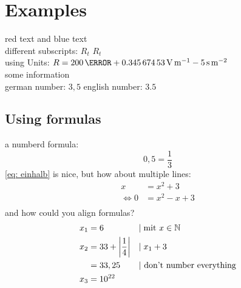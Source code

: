 \documentclass[	%
		fontsize=11pt,  %
		a4paper,	    %
		english,		%
		sans,			%
		f1,				%
	]{HsH-report}		%
\begin{document}
\chapter{Examples} \label{chap: one}
	{\color{red}red text} and {\color{blue}blue text} \\
	different subscripts: \normalsubscripts$R_t$ \upsubscripts$R_t$ \\
	using Units: $R=200\,\mohm + \SI{0.34567453}{\volt\per\metre} - 5\,\si{\second\per\metre\squared}$ \\
	some information\cite{laboranleitung:physik}\\
	german number: $3,5$ english number: $3.5$\\ %


	\section{Using formulas} \label{sec: formula}
		a numberd formula:
		\begin{equation}
			\label{eq: einhalb} %
			0,5=\frac{1}{3}
		\end{equation}
		\autoref{eq: einhalb} is nice, but how about multiple lines:
		\begin{equation}
		\begin{split} %
			x &= x^2+3 \\
			\Leftrightarrow 0 &= x^2-x+3 \\
		\end{split}
		\end{equation}
		and how could you align formulas?
		\begin{align}
			x_1 &= 6 &&|\;\mbox{mit } x \in \mathbb{N} \\
			x_2 &= 33+\left\vert\frac{1}{4}\right\vert &&|\;x_1+3 \\
				&= 33,25 &&\mbox{| don't number everything} \notag \\
			x_3 &= 10^{22}
		\end{align}
\end{document}
